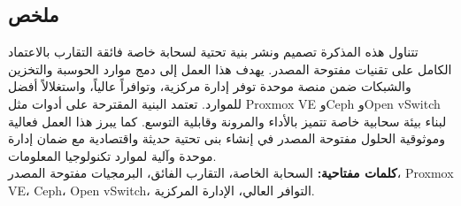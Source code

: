 \documentclass[a4paper,12pt]{article}
\begin{document}
\vspace{0.5cm}

\begin{Arabic}
\section*{ملخص}

تتناول هذه المذكرة تصميم ونشر بنية تحتية لسحابة خاصة فائقة التقارب بالاعتماد الكامل على تقنيات مفتوحة المصدر. يهدف هذا العمل إلى دمج موارد الحوسبة والتخزين والشبكات ضمن منصة موحدة توفر إدارة مركزية، وتوافراً عالياً، واستغلالاً أفضل للموارد. تعتمد البنية المقترحة على أدوات مثل Proxmox VE وCeph وOpen vSwitch لبناء بيئة سحابية خاصة تتميز بالأداء والمرونة وقابلية التوسع. كما يبرز هذا العمل فعالية وموثوقية الحلول مفتوحة المصدر في إنشاء بنى تحتية حديثة واقتصادية مع ضمان إدارة موحدة وآلية لموارد تكنولوجيا المعلومات. \\

\textbf{كلمات مفتاحية:} السحابة الخاصة، التقارب الفائق، البرمجيات مفتوحة المصدر، Proxmox VE، Ceph، Open vSwitch، التوافر العالي، الإدارة المركزية.
\end{Arabic}
\end{document}
